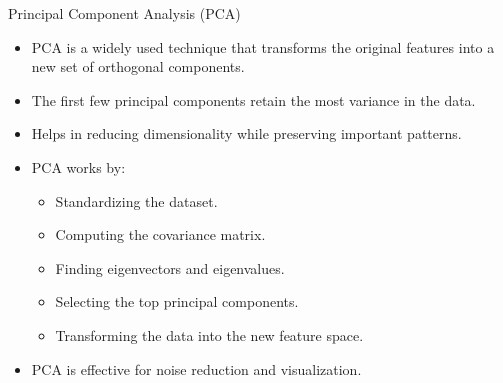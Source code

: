 \documentclass[11pt]{beamer}
\begin{document}
\begin{frame}{Principal Component Analysis (PCA)}
    \begin{itemize}
        \item PCA is a widely used technique that transforms the original features into a new set of orthogonal components.
        \item The first few principal components retain the most variance in the data.
        \item Helps in reducing dimensionality while preserving important patterns.
        \item PCA works by:
        \begin{itemize}
            \item Standardizing the dataset.
            \item Computing the covariance matrix.
            \item Finding eigenvectors and eigenvalues.
            \item Selecting the top principal components.
            \item Transforming the data into the new feature space.
        \end{itemize}
        \item PCA is effective for noise reduction and visualization.
    \end{itemize}
\end{frame}
\end{document}
